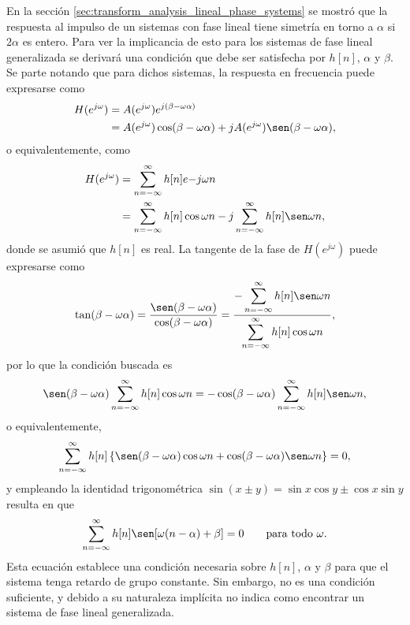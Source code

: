 \documentclass[a4paper]{report}
\begin{document}
En la sección \ref{sec:transform_analysis_lineal_phase_systems} se mostró que la respuesta al impulso de un sistemas con fase lineal tiene simetría en torno a \(\alpha\) si \(2\alpha\) es entero. Para ver la implicancia de esto para los sistemas de fase lineal generalizada se derivará una condición que debe ser satisfecha por \(h[n]\), \(\alpha\) y \(\beta\). Se parte notando que para dichos sistemas, la respuesta en frecuencia puede expresarse como
\begin{align*}
 H(e^{j\omega})&=A(e^{j\omega})e^{j(\beta-\omega\alpha)}\\
  &=A(e^{j\omega})\cos(\beta-\omega\alpha)+jA(e^{j\omega})\sen(\beta-\omega\alpha),
\end{align*}
o equivalentemente, como
\begin{align*}
 H(e^{j\omega})&=\sum_{n=-\infty}^\infty h[n]e{-j\omega n}\\
  &=\sum_{n=-\infty}^\infty h[n]\cos\omega n-j\sum_{n=-\infty}^\infty h[n]\sen\omega n,
\end{align*}
donde se asumió que \(h[n]\) es real. La tangente de la fase de \(H(e^{j\omega})\) puede expresarse como 
\[
 \tan(\beta-\omega\alpha)=\frac{\sen(\beta-\omega\alpha)}{\cos(\beta-\omega\alpha)}
  =\dfrac{-\displaystyle\sum_{n=-\infty}^\infty h[n]\sen\omega n}{\displaystyle\sum_{n=-\infty}^\infty h[n]\cos\omega n},
\]
por lo que la condición buscada es
\[
 \sen(\beta-\omega\alpha)\sum_{n=-\infty}^\infty h[n]\cos\omega n=-\cos(\beta-\omega\alpha)\sum_{n=-\infty}^\infty h[n]\sen\omega n,
\]
o equivalentemente,
\[
 \sum_{n=-\infty}^\infty h[n]\left\{\sen(\beta-\omega\alpha)\cos\omega n+\cos(\beta-\omega\alpha)\sen\omega n\right\}=0,
\]
y empleando la identidad trigonométrica \(\sin(x\pm y)=\sin x\cos y\pm\cos x\sin y\) resulta en que 
\begin{equation}\label{eq:transform_analysis_generalizaed_lineal_phase_general_condition}
 \sum_{n=-\infty}^\infty h[n]\sen[\omega(n-\alpha)+\beta]=0
 \qquad\textrm{para todo }\omega. 
\end{equation}
Esta ecuación establece una condición necesaria sobre \(h[n]\), \(\alpha\) y \(\beta\) para que el sistema tenga retardo de grupo constante. Sin embargo, no es una condición suficiente, y debido a su naturaleza implícita no indica como encontrar un sistema de fase lineal generalizada.
\end{document}
